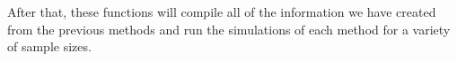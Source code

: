 \documentclass[12pt]{article}
\newenvironment{Shaded}{\begin{snugshade}}{\end{snugshade}}
\newcommand{\AttributeTok}[1]{\textcolor[rgb]{0.77,0.63,0.00}{#1}}
\newcommand{\DecValTok}[1]{\textcolor[rgb]{0.00,0.00,0.81}{#1}}
\newcommand{\FunctionTok}[1]{\textcolor[rgb]{0.00,0.00,0.00}{#1}}
\newcommand{\NormalTok}[1]{#1}
\newcommand{\OtherTok}[1]{\textcolor[rgb]{0.56,0.35,0.01}{#1}}
\newcommand{\SpecialCharTok}[1]{\textcolor[rgb]{0.00,0.00,0.00}{#1}}
\newcommand{\StringTok}[1]{\textcolor[rgb]{0.31,0.60,0.02}{#1}}
\begin{document}
\begin{Shaded}
\end{Shaded}

After that, these functions will compile all of the information we have
created from the previous methods and run the simulations of each method
for a variety of sample sizes.
\end{document}
